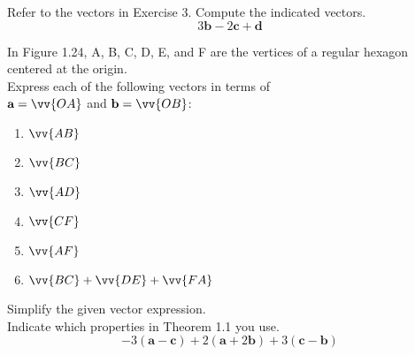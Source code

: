 \documentclass[11pt,letterpaper,boxed]{hmcpset}
\begin{document}
\begin{problem}[\#12] 
Refer to the vectors in Exercise 3. Compute the indicated vectors.\\
\[
3\textbf{b}-2\textbf{c}+\textbf{d}
\]
\end{problem}



\pagebreak


\begin{problem}[\#14] 
In Figure 1.24, A, B, C, D, E, and F are the vertices of a regular hexagon centered at the origin.\\
Express each of the following vectors in terms of\\
$\textbf{a}=\vv{OA}$ and $\textbf{b}=\vv{OB}$:
\begin{enumerate}
\item $\vv{AB}$
\item $\vv{BC}$
\item $\vv{AD}$
\item $\vv{CF}$
\item $\vv{AF}$
\item $\vv{BC}+\vv{DE}+\vv{FA}$
\end{enumerate}
\end{problem}



\pagebreak


\begin{problem}[\#16] 
Simplify the given vector expression.\\
Indicate which properties in Theorem 1.1 you use.\\
\[
-3(\textbf{a}-\textbf{c})+2(\textbf{a}+2\textbf{b})+3(\textbf{c}-\textbf{b})
\]
\end{problem}


\end{document}
